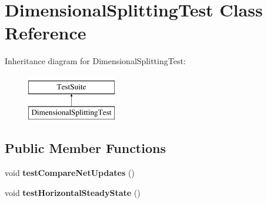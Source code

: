 \hypertarget{classDimensionalSplittingTest}{\section{Dimensional\-Splitting\-Test Class Reference}
\label{classDimensionalSplittingTest}
}
Inheritance diagram for Dimensional\-Splitting\-Test\-:\begin{figure}[H]
\begin{center}
\leavevmode
\includegraphics[height=2.000000cm]{classDimensionalSplittingTest}
\end{center}
\end{figure}
\subsection*{Public Member Functions}
\begin{DoxyCompactItemize}
\item 
\hypertarget{classDimensionalSplittingTest_a05a00dd732a468367450251ad1d86948}{void {\bfseries test\-Compare\-Net\-Updates} ()}\label{classDimensionalSplittingTest_a05a00dd732a468367450251ad1d86948}

\item 
\hypertarget{classDimensionalSplittingTest_a023866cfa25daf91189f77efbc1dffc6}{void {\bfseries test\-Horizontal\-Steady\-State} ()}\label{classDimensionalSplittingTest_a023866cfa25daf91189f77efbc1dffc6}

\end{DoxyCompactItemize}
